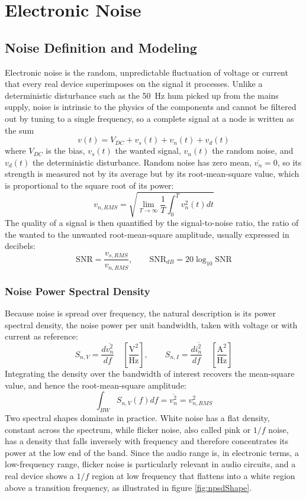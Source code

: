 
\graphicspath{{00_Images/10_chapter/}}

\chapter{Electronic Noise}
\label{ch:noise}

\section{Noise Definition and Modeling}
\label{sc:101}

Electronic noise is the random, unpredictable fluctuation of voltage or current that every real device superimposes on the signal it processes.
Unlike a deterministic disturbance such as the \SI{50}{\hertz} hum picked up from the mains supply, noise is intrinsic to the physics of the components and cannot be filtered out by tuning to a single frequency, so a complete signal at a node is written as the sum
\[
v(t) = V_{DC} + v_s(t) + v_n(t) + v_d(t)
\]
where \(V_{DC}\) is the bias, \(v_s(t)\) the wanted signal, \(v_n(t)\) the random noise, and \(v_d(t)\) the deterministic disturbance.
Random noise has zero mean, \(\overline{v_n} = 0\), so its strength is measured not by its average but by its root-mean-square value, which is proportional to the square root of its power:
\[
v_{n,RMS} = \sqrt{\lim_{T \to \infty} \frac{1}{T}\int_0^T v_n^2(t) dt}
\]
The quality of a signal is then quantified by the signal-to-noise ratio, the ratio of the wanted to the unwanted root-mean-square amplitude, usually expressed in decibels:
\[
\mathrm{SNR} = \frac{v_{s,RMS}}{v_{n,RMS}}, \qquad \mathrm{SNR}_{dB} = 20\log_{10}\mathrm{SNR}
\]

\subsection{Noise Power Spectral Density}
\label{ssc:1011}

Because noise is spread over frequency, the natural description is its power spectral density, the noise power per unit bandwidth, taken with voltage or with current as reference:
\[
S_{n,V} = \frac{d\overline{v_n^2}}{df}\quad\left[\frac{\mathrm{V}^2}{\mathrm{Hz}}\right], \qquad S_{n,I} = \frac{d\overline{i_n^2}}{df}\quad\left[\frac{\mathrm{A}^2}{\mathrm{Hz}}\right]
\]
Integrating the density over the bandwidth of interest recovers the mean-square value, and hence the root-mean-square amplitude:
\[
\int_{BW} S_{n,V}(f) df = \overline{v_n^2} = v_{n,RMS}^2
\]
Two spectral shapes dominate in practice.
White noise has a flat density, constant across the spectrum, while flicker noise, also called pink or \(1/f\) noise, has a density that falls inversely with frequency and therefore concentrates its power at the low end of the band.
Since the audio range is, in electronic terms, a low-frequency range, flicker noise is particularly relevant in audio circuits, and a real device shows a \(1/f\) region at low frequency that flattens into a white region above a transition frequency, as illustrated in figure \ref{fig:npsdShape}.

